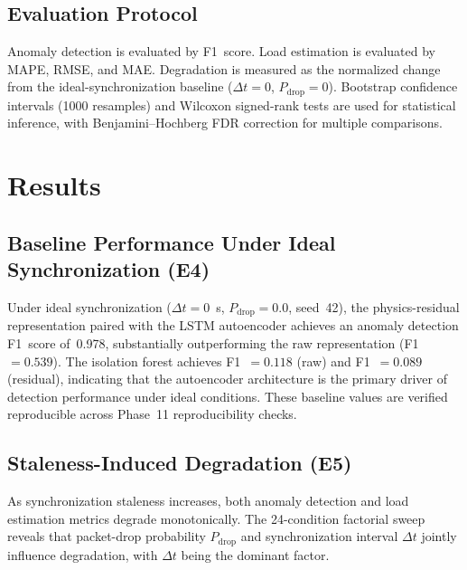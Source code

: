 \documentclass[journal]{IEEEtran}
\newcommand{\dtsync}{\Delta t}
\newcommand{\pdrop}{P_{\mathrm{drop}}}
\begin{document}
\subsection{Evaluation Protocol}
Anomaly detection is evaluated by F1~score. Load estimation is evaluated
by MAPE, RMSE, and MAE. Degradation is measured as the normalized change
from the ideal-synchronization baseline ($\dtsync = 0$, $\pdrop = 0$).
Bootstrap confidence intervals (1000 resamples) and Wilcoxon signed-rank
tests are used for statistical inference, with Benjamini--Hochberg FDR
correction for multiple comparisons.


\section{Results}
\label{sec:results}

\subsection{Baseline Performance Under Ideal Synchronization (E4)}
Under ideal synchronization ($\dtsync = 0$~s, $\pdrop = 0.0$, seed~42),
the physics-residual representation paired with the LSTM autoencoder
achieves an anomaly detection F1~score of~0.978, substantially outperforming
the raw representation (F1~$= 0.539$). The isolation forest achieves
F1~$= 0.118$ (raw) and F1~$= 0.089$ (residual), indicating that the
autoencoder architecture is the primary driver of detection performance
under ideal conditions. These baseline values are verified reproducible
across Phase~11 reproducibility checks.



\subsection{Staleness-Induced Degradation (E5)}
As synchronization staleness increases, both anomaly detection and load
estimation metrics degrade monotonically. The 24-condition factorial sweep
reveals that packet-drop probability $\pdrop$ and synchronization interval
$\dtsync$ jointly influence degradation, with $\dtsync$ being the dominant
factor.




\end{document}
